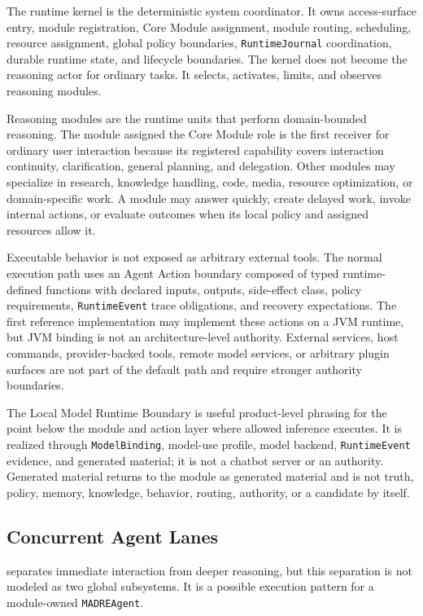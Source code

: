 The \Madre runtime kernel is the deterministic system coordinator. It owns access-surface entry, module registration, Core Module assignment, module routing, scheduling, resource assignment, global policy boundaries, \texttt{RuntimeJournal} coordination, durable runtime state, and lifecycle boundaries. The kernel does not become the reasoning actor for ordinary tasks. It selects, activates, limits, and observes reasoning modules.

Reasoning modules are the runtime units that perform domain-bounded reasoning. The module assigned the Core Module role is the first receiver for ordinary user interaction because its registered capability covers interaction continuity, clarification, general planning, and delegation. Other modules may specialize in research, knowledge handling, code, media, resource optimization, or domain-specific work. A module may answer quickly, create delayed work, invoke internal actions, or evaluate outcomes when its local policy and assigned resources allow it.

Executable behavior is not exposed as arbitrary external tools. The normal execution path uses an Agent Action boundary composed of typed runtime-defined functions with declared inputs, outputs, side-effect class, policy requirements, \texttt{RuntimeEvent} trace obligations, and recovery expectations. The first reference implementation may implement these actions on a JVM runtime, but JVM binding is not an architecture-level authority. External services, host commands, provider-backed tools, remote model services, or arbitrary plugin surfaces are not part of the default path and require stronger authority boundaries.

The Local Model Runtime Boundary is useful product-level phrasing for the point below the module and action layer where allowed inference executes. It is realized through \texttt{ModelBinding}, model-use profile, model backend, \texttt{RuntimeEvent} evidence, and generated material; it is not a chatbot server or an authority. Generated material returns to the module as generated material and is not truth, policy, memory, knowledge, behavior, routing, authority, or a candidate by itself.


\subsection{Concurrent Agent Lanes}

\Madre separates immediate interaction from deeper reasoning, but this separation is not modeled as two global subsystems. It is a possible execution pattern for a module-owned \texttt{MADREAgent}.

